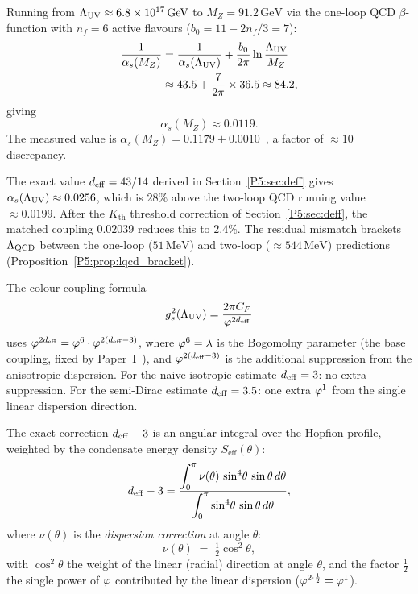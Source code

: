 Running from $\Lambda_{\mathrm{UV}}\approx6.8\times10^{17}\,\mathrm{GeV}$ to
$M_Z=91.2\,\mathrm{GeV}$ via the one-loop QCD $\beta$-function
with $n_f=6$ active flavours ($b_0 = 11 - 2n_f/3 = 7$):
\begin{align}
  \frac{1}{\alpha_s(M_Z)}
  &= \frac{1}{\alpha_s(\Lambda_{\mathrm{UV}})} + \frac{b_0}{2\pi}\ln\frac{\Lambda_{\mathrm{UV}}}{M_Z}
  \notag \\
  &\approx 43.5 + \frac{7}{2\pi}\times 36.5
  \approx 84.2,
  \label{P5:eq:as_running}
\end{align}
giving
\begin{equation}
  \boxed{\alpha_s(M_Z) \approx 0.0119.}
  \label{P5:eq:as_mZ}
\end{equation}
The measured value is $\alpha_s(M_Z) = 0.1179\pm0.0010$~\cite{PDG2024},
a factor of $\approx10$ discrepancy.

The exact value $d_{\mathrm{eff}}=43/14$ derived in Section~\ref{P5:sec:deff}
gives $\alpha_s(\Lambda_{\mathrm{UV}})\approx0.0256$, which is $28\%$ above the
two-loop QCD running value $\approx0.0199$.
After the $K_{\mathrm{th}}$ threshold correction of Section~\ref{P5:sec:deff},
the matched coupling $0.02039$ reduces this to $2.4\%$.
The residual mismatch brackets $\Lambda_{\mathrm{QCD}}$ between the one-loop
($51\,\mathrm{MeV}$) and two-loop ($\approx544\,\mathrm{MeV}$) predictions
(Proposition~\ref{P5:prop:lqcd_bracket}).

\noindent The colour coupling formula
\begin{equation}
  g_s^2(\Lambda_{\mathrm{UV}})
  = \frac{2\pi C_F}{\varphi^{2d_{\mathrm{eff}}}}
  \label{P5:eq:gs_deff}
\end{equation}
uses $\varphi^{2d_{\mathrm{eff}}} = \varphi^6\cdot\varphi^{2(d_{\mathrm{eff}}-3)}$, where $\varphi^6=\lambda$
is the Bogomolny parameter (the base coupling, fixed by Paper~I~\cite{Paper1}), and
$\varphi^{2(d_{\mathrm{eff}}-3)}$ is the additional suppression from the anisotropic
dispersion.
For the naive isotropic estimate $d_{\mathrm{eff}}=3$: no extra suppression.
For the semi-Dirac estimate $d_{\mathrm{eff}}=3.5$: one extra $\varphi^1$ from the
single linear dispersion direction.

The exact correction $d_{\mathrm{eff}}-3$ is an angular integral over the Hopfion
profile, weighted by the condensate energy density $S_{\mathrm{eff}}(\theta)$:
\begin{equation}
  d_{\mathrm{eff}} - 3
  = \frac{\displaystyle\int_0^\pi
    \nu(\theta)\,\sin^4\!\theta\,\sin\theta\,d\theta}
         {\displaystyle\int_0^\pi \sin^4\!\theta\,\sin\theta\,d\theta},
  \label{P5:eq:deff_integral}
\end{equation}
where $\nu(\theta)$ is the \emph{dispersion correction} at angle $\theta$:
\begin{equation}
  \nu(\theta) \;=\; \tfrac{1}{2}\cos^2\!\theta,
  \label{P5:eq:nu_theta}
\end{equation}
with $\cos^2\!\theta$ the weight of the linear (radial) direction
at angle $\theta$, and the factor $\tfrac{1}{2}$ the single power
of $\varphi$ contributed by the linear dispersion
($\varphi^{2\cdot\frac{1}{2}} = \varphi^1$).

